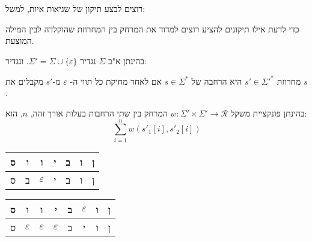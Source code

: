 רוצים לבצע תיקון של שגיאות איות, למשל:
\begin{center}
\end{center}

כדי לדעת אילו תיקונים להציע רוצים למדוד את המרחק בין המחרוזת שהוקלדה לבין המילה המוצעת.

בהינתן א"ב 
$\Sigma$
נגדיר
$\Sigma' = \Sigma \cup \{\varepsilon\}$.
ונגדיר:
\begin{definition}[הרחבה]
מחרוזת
$s' \in \Sigma'^*$
היא הרחבה של
$s \in \Sigma^*$ 
אם לאחר מחיקת כל תווי ה-%
$\varepsilon$
מ-$s'$ מקבלים את $s$.
\end{definition}

בהינתן פונקציית משקל 
$w: \Sigma' \times \Sigma' \to \mathcal{R}$
המרחק בין שתי הרחבות בעלות אורך זהה, $n$, הוא:
$$\sum_{i = 1}^n w(s'_1[i], s'_2[i])$$

\begin{example}
\label{example:1}
\begin{tabular}{|c|c|c|c|c|c|c|}
\hline
ס & ו & ו & י & ב & ו & ן
\\\hline
ס & ב & $\varepsilon$ & י & ב & ו & ן
\\\hline
\end{tabular}
\end{example}

\begin{example}
\label{example:2}
\begin{tabular}{|c|c|c|c|c|c|c|c|}
\hline
ס 
& ו
& ו 
& י 
& ב
& $\varepsilon$  
& ו 
& ן
\\\hline
ס 
& $\varepsilon$ 
& $\varepsilon$ 
& $\varepsilon$ 
& ב 
& י 
& ו 
& ן
\\\hline
\end{tabular}
\end{example}

